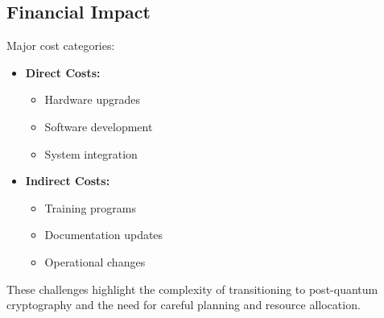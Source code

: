 \subsection{Financial Impact}\label{subsec:financial}
Major cost categories:

\begin{itemize}
    \item \textbf{Direct Costs:}
    \begin{itemize}
        \item Hardware upgrades
        \item Software development
        \item System integration
    \end{itemize}
    \item \textbf{Indirect Costs:}
    \begin{itemize}
        \item Training programs
        \item Documentation updates
        \item Operational changes
    \end{itemize}
\end{itemize}

These challenges highlight the complexity of transitioning to post-quantum cryptography and the need for careful planning and resource allocation.